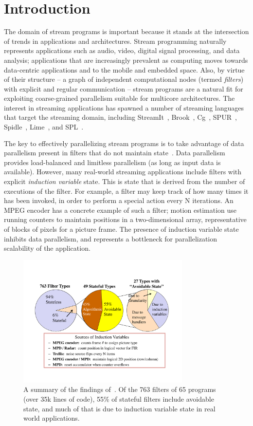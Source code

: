 \section{Introduction}

The domain of stream programs is important because it stands at the
intersection of trends in applications and architectures.  Stream
programming naturally represents applications such as audio, video,
digital signal processing, and data analysis; applications that are
increasingly prevalent as computing moves towards data-centric
applications and to the mobile and embedded space.  Also, by virtue of
their structure -- a graph of independent computational nodes (termed
{\it filters}) with explicit and regular communication -- stream
programs are a natural fit for exploiting coarse-grained parallelism
suitable for multicore architectures.  The interest in streaming
applications has spawned a number of streaming languages that target
the streaming domain, including StreamIt~\cite{streamitcc},
Brook~\cite{brook04}, Cg~\cite{cg03},
SPUR~\cite{spur05samos}, Spidle~\cite{spidle03}, Lime~\cite{lime10},
and SPL~\cite{spl09}.

The key to effectively parallelizing stream programs is to take
advantage of data parallelism present in filters that do not maintain
state~\cite{gordon-asplos06}.  Data parallelism provides load-balanced
and limitless parallelism (as long as input data is
available). However, many real-world streaming applications include
filters with explicit {\it induction variable} state. This is state
that is derived from the number of executions of the filter. For
example, a filter may keep track of how many times it has been
invoked, in order to perform a special action every N iterations. An
MPEG encoder has a concrete example of such a filter; motion estimation
use running counters to maintain positions in a two-dimensional array,
representative of blocks of pixels for a picture frame.  The
presence of induction variable state inhibits data parallelism, and
represents a bottleneck for parallelization scalability of the
application.

\begin{figure}[t!]
\centering
\includegraphics[width=3.4in]{figures/state-figure.pdf}
\caption{A summary of the findings of~\cite{streamit-suite}.  Of the
  763 filters of 65 programs (over 35k lines of code), 55\% of
  stateful filters include avoidable state, and much of that is due to
  induction variable state in real world
  applications.\protect\label{fig:state}}
\end{figure}

